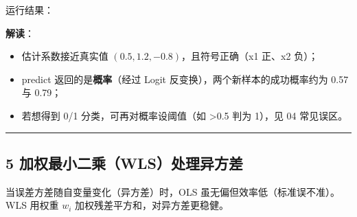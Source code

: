 运行结果：

\begin{Shaded}
\begin{Highlighting}[]
\end{Highlighting}
\end{Shaded}

\textbf{解读}：

\begin{itemize}
\tightlist
\item
  估计系数接近真实值 \((0.5, 1.2, -0.8)\)，且符号正确（x1 正、x2 负）；
\item
  predict 返回的是\textbf{概率}（经过 Logit
  反变换），两个新样本的成功概率约为 0.57 与 0.79；
\item
  若想得到 0/1 分类，可再对概率设阈值（如 \textgreater0.5 判为 1），见
  04 常见误区。
\end{itemize}

\begin{center}\rule{0.5\linewidth}{0.5pt}\end{center}

\subsection{5
加权最小二乘（WLS）处理异方差}\label{ux52a0ux6743ux6700ux5c0fux4e8cux4e58wlsux5904ux7406ux5f02ux65b9ux5dee}

当误差方差随自变量变化（异方差）时，OLS
虽无偏但效率低（标准误不准）。WLS 用权重 \(w_i\)
加权残差平方和，对异方差更稳健。

